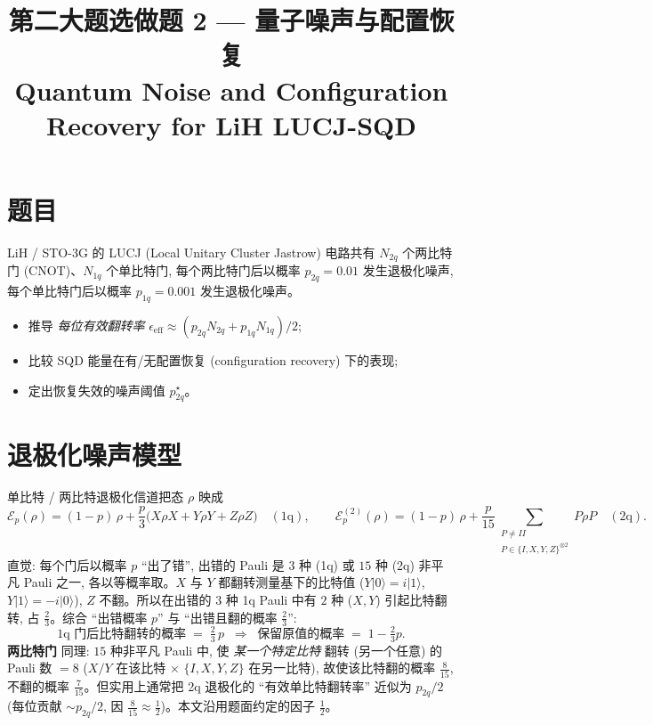 \documentclass[11pt]{article}
\title{\textbf{第二大题选做题 2 --- 量子噪声与配置恢复}\\
Quantum Noise and Configuration Recovery for LiH LUCJ-SQD}
\date{}
\begin{document}
\maketitle

\section*{题目}
LiH / STO-3G 的 LUCJ (Local Unitary Cluster Jastrow) 电路共有 $N_{2q}$ 个两比特门
(CNOT)、$N_{1q}$ 个单比特门, 每个两比特门后以概率 $p_{2q}{=}0.01$ 发生退极化噪声,
每个单比特门后以概率 $p_{1q}{=}0.001$ 发生退极化噪声。
\begin{itemize}
  \item 推导 \emph{每位有效翻转率} $\epsilon_{\text{eff}}\approx
        (p_{2q}N_{2q}+p_{1q}N_{1q})/2$;
  \item 比较 SQD 能量在有/无配置恢复 (configuration recovery) 下的表现;
  \item 定出恢复失效的噪声阈值 $p_{2q}^{\star}$。
\end{itemize}

\section{退极化噪声模型}
单比特 / 两比特退极化信道把态 $\rho$ 映成
\[
  \mathcal{E}_p(\rho)=(1-p)\,\rho+\frac{p}{3}\bigl(X\rho X+Y\rho Y+Z\rho Z\bigr)
  \quad(\text{1q}),\qquad
  \mathcal{E}_p^{(2)}(\rho)=(1-p)\,\rho+\frac{p}{15}\!\!\sum_{\substack{P\ne II\\P\in\{I,X,Y,Z\}^{\otimes2}}}\!\!P\rho P
  \quad(\text{2q}).
\]
直觉: 每个门后以概率 $p$ ``出了错'', 出错的 Pauli 是 $3$ 种 (1q) 或 $15$ 种 (2q) 非平凡
Pauli 之一, 各以等概率取。$X$ 与 $Y$ 都翻转测量基下的比特值 ($Y|0\rangle=i|1\rangle$,
$Y|1\rangle=-i|0\rangle$), $Z$ 不翻。所以在出错的 $3$ 种 1q Pauli 中有 $2$ 种 ($X,Y$)
引起比特翻转, 占 $\tfrac23$。综合 ``出错概率 $p$'' 与 ``出错且翻的概率 $\tfrac23$'':
\[
  \boxed{\;\text{1q 门后比特翻转的概率} \;=\; \tfrac{2}{3}\,p
        \;\;\Rightarrow\;\; \text{保留原值的概率} \;=\; 1-\tfrac{2}{3}p.\;}
\]
\textbf{两比特门} 同理: $15$ 种非平凡 Pauli 中, 使 \emph{某一个特定比特} 翻转
(另一个任意) 的 Pauli 数 $=8$ ($X/Y$ 在该比特 $\times$ $\{I,X,Y,Z\}$ 在另一比特),
故使该比特翻的概率 $\tfrac{8}{15}$, 不翻的概率 $\tfrac{7}{15}$。但实用上通常把 2q
退极化的 ``有效单比特翻转率'' 近似为 $p_{2q}/2$ (每位贡献 $\sim p_{2q}/2$, 因
$\tfrac{8}{15}\approx\tfrac12$)。本文沿用题面约定的因子 $\tfrac12$。
\end{document}
